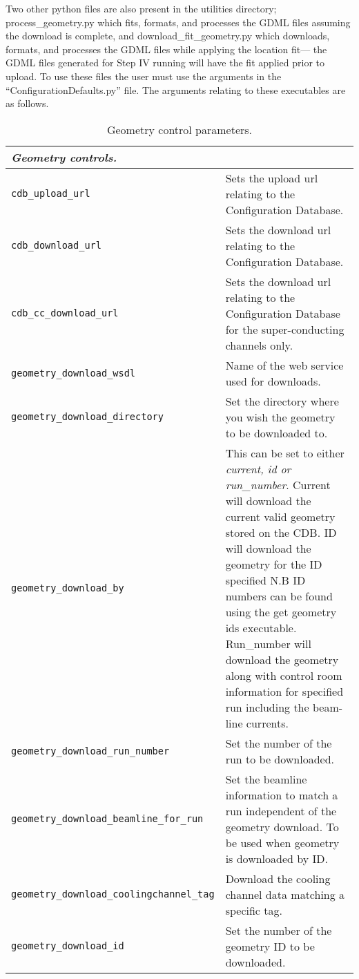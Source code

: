 Two other python files are also present in the utilities directory;
process\_geometry.py which fits, formats, and processes the GDML files
assuming the download is complete, and download\_fit\_geometry.py
which downloads, formats, and processes the GDML files while applying
the location fit--- the GDML files generated for Step IV running will
have the fit applied prior to upload. To use these files the user must
use the arguments in the ``ConfigurationDefaults.py'' file. The
arguments relating to these executables are as follows.

\begin{table*}
\begin{center}
\caption{Geometry control parameters.}
\begin{tabularx}{\textwidth}{lX}
\hline
\multicolumn{2}{l}{\emph{Geometry controls.}} \\
\hline
\verb|cdb_upload_url| & Sets the upload url relating to the Configuration Database.\\
\verb|cdb_download_url| & Sets the download url relating to the Configuration Database.\\
\verb|cdb_cc_download_url| & Sets the download url relating to the Configuration Database for the super-conducting channels only.\\
\verb|geometry_download_wsdl| & Name of the web service used for downloads.\\
\verb|geometry_download_directory| & Set the directory where you wish the geometry to be downloaded to.\\
\verb|geometry_download_by| & This can be set to either \textit{current, id or run\_number}. Current will download the current valid geometry stored
on the CDB. ID will download the geometry for the ID specified N.B ID numbers can be found using the get geometry ids executable. Run\_number will
download the geometry along with control room information for specified run including the beam-line currents. \\ 
\verb|geometry_download_run_number| & Set the number of the run to be downloaded.\\
\verb|geometry_download_beamline_for_run| & Set the beamline information to match a run independent of the geometry download. To be used when 
geometry is downloaded by ID.\\
\verb|geometry_download_coolingchannel_tag| & Download the cooling channel data matching a specific tag.\\
\verb|geometry_download_id| & Set the number of the geometry ID to be downloaded.\\

\end{tabularx}
\end{center}
\end{table*}
